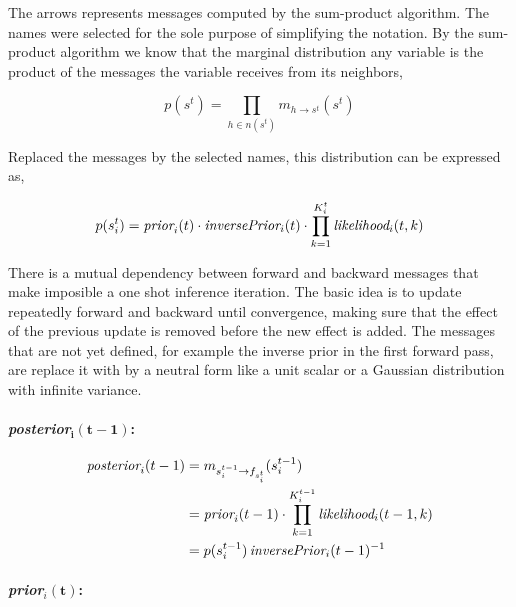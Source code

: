 \documentclass[article]{jss}
\begin{document}
The arrows represents messages computed by the sum-product algorithm.
The names were selected for the sole purpose of simplifying the notation.
By the sum-product algorithm we know that the marginal distribution any variable is the product of the messages the variable receives from its neighbors,

\begin{equation}
 p(s^t) = \prod_{h \in n(s^t)} m_{h \rightarrow s^t}(s^t)
\end{equation}

Replaced the messages by the selected names, this distribution can be expressed as,

\begin{equation}
 p(s_i^t) = \emph{prior}_i(t) \cdot \emph{inversePrior}_i(t) \cdot \prod_{k=1}^{K_i^t} \emph{likelihood}_i(t,k)
\end{equation}

There is a mutual dependency between forward and backward messages that make imposible a one shot inference iteration.
The basic idea is to update repeatedly forward and backward until convergence, making sure that the effect of the previous update is removed before the new effect is added.
The messages that are not yet defined, for example the inverse prior in the first forward pass, are replace it with by a neutral form like a unit scalar or a Gaussian distribution with infinite variance.

\vspace{0.3cm}

\paragraph{\emph{posterior}$\bm{_i(t-1)}$:}

\begin{equation}
\begin{split}
  \emph{posterior}_i(t-1)&= m_{s_i^{t-1}\rightarrow f_{s_i^t}}(s_i^{t-1}) \\
 &= \emph{prior}_i(t-1) \cdot \prod_{k=1}^{K_i^{t-1}} \emph{likelihood}_i(t-1,k)\\
 &= p(s_i^{t-1}) \, \emph{inversePrior}_i(t-1)^{-1}
 \end{split}
\end{equation}


 \paragraph{\emph{prior}$_i\bm{(t)}$:}
\end{document}
